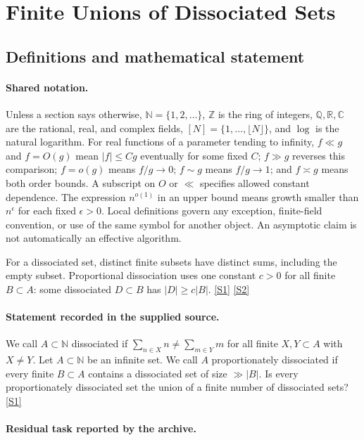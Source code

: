 \documentclass[11pt,a4paper]{article}
\newcommand{\N}{\mathbb{N}}
\newcommand{\Z}{\mathbb{Z}}
\newcommand{\Q}{\mathbb{Q}}
\newcommand{\R}{\mathbb{R}}
\newcommand{\C}{\mathbb{C}}
\newcommand{\sref}[2]{\hyperlink{source:#1:#2}{[S#2]}}
\begin{document}
\section{Finite Unions of Dissociated Sets}\label{statement}


\subsection{Definitions and mathematical statement}

\paragraph{Shared notation.}Unless a section says otherwise, $\N=\{1,2,\ldots\}$,
$\Z$ is the ring of integers, $\Q,\R,\C$ are the rational, real, and complex
fields, $[N]=\{1,\ldots,\lfloor N\rfloor\}$, and $\log$ is the natural
logarithm. For real functions of a parameter tending to infinity,
$f\ll g$ and $f=O(g)$ mean $|f|\leq Cg$ eventually for some fixed $C$;
$f\gg g$ reverses this comparison; $f=o(g)$ means $f/g\to0$;
$f\sim g$ means $f/g\to1$; and $f\asymp g$ means both order bounds.
A subscript on $O$ or $\ll$ specifies allowed constant dependence.
The expression $n^{o(1)}$ in an upper bound means growth smaller than
$n^\epsilon$ for each fixed $\epsilon>0$. Local definitions govern any
exception, finite-field convention, or use of the same symbol for another
object. An asymptotic claim is not automatically an effective algorithm.



For a dissociated set, distinct finite subsets have distinct sums, including the empty subset. Proportional dissociation uses one constant $c>0$ for all finite $B\subset A$: some dissociated $D\subset B$ has $|D|\geq c|B|$. \sref{statement}{1} \sref{statement}{2}

\paragraph{Statement recorded in the supplied source.}
We call $A\subset \mathbb{N}$ dissociated if $\sum_{n\in X}n\neq \sum_{m\in Y}m$ for all finite $X,Y\subset A$ with $X\neq Y$.
Let $A\subset \mathbb{N}$ be an infinite set. We call $A$ proportionately dissociated if every finite $B\subset A$ contains a dissociated set of size $\gg \lvert B\rvert$.
Is every proportionately dissociated set the union of a finite number of dissociated sets? \sref{statement}{1}

\paragraph{Residual task reported by the archive.}
\end{document}
